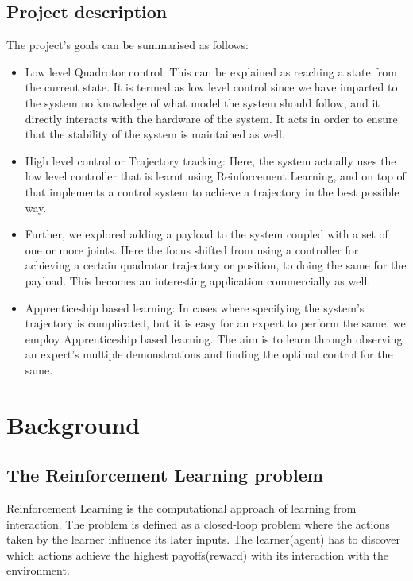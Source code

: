 \documentclass[hidelinks,BTech]{iitmdiss}
\begin{document}
\section{Project description}
The project's goals can be summarised as follows:
\begin{itemize}
	\item {Low level Quadrotor control: This can be explained as reaching a state from the current state. It is termed as low level control since we have imparted to the system no knowledge of what model the system should follow, and it directly interacts with the hardware of the system. It acts in order to ensure that the stability of the system is maintained as well.}
	\item {High level control or Trajectory tracking: Here, the system actually uses the low level controller that is learnt using Reinforcement Learning, and on top of that implements a control system to achieve a trajectory in the best possible way.}
	\item {Further, we explored adding a payload to the system coupled with a set of one or more joints. Here the focus shifted from using a controller for achieving a certain quadrotor trajectory or position, to doing the same for the payload. This becomes an interesting application commercially as well.}
	\item {Apprenticeship based learning: In cases where specifying the system's trajectory is complicated, but it is easy for an expert to perform the same, we employ Apprenticeship based learning. The aim is to learn through observing an expert's multiple demonstrations and finding the optimal control for the same.}
\end{itemize}

\chapter{Background}
\section {The Reinforcement Learning problem}
Reinforcement Learning is the computational approach of learning from interaction. The problem is defined as a closed-loop problem where the actions taken by the learner influence its later inputs. The learner(agent) has to discover which actions achieve the highest payoffs(reward) with its interaction with the environment. 
\end{document}
